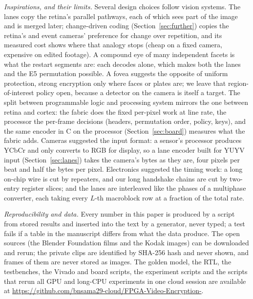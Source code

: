 \textit{Inspirations, and their limits.} Several design choices follow vision systems. The lanes copy the retina's parallel pathways, each of which sees part of the image and is merged later; change-driven coding (Section~\ref{sec:further}) copies the retina's and event cameras' preference for change over repetition, and its measured cost shows where that analogy stops (cheap on a fixed camera, expensive on edited footage). A compound eye of many independent facets is what the restart segments are: each decodes alone, which makes both the lanes and the E5 permutation possible. A fovea suggests the opposite of uniform protection, strong encryption only where faces or plates are; we leave that region-of-interest policy open, because a detector on the camera is itself a target. The split between programmable logic and processing system mirrors the one between retina and cortex: the fabric does the fixed per-pixel work at line rate, the processor the per-frame decisions (headers, permutation order, policy, keys), and the same encoder in C on the processor (Section~\ref{sec:board}) measures what the fabric adds. Cameras suggested the input format: a sensor's processor produces YCbCr and only converts to RGB for display, so a lane encoder built for YUYV input (Section~\ref{sec:lanes}) takes the camera's bytes as they are, four pixels per beat and half the bytes per pixel. Electronics suggested the timing work: a long on-chip wire is cut by repeaters, and our long handshake chains are cut by two-entry register slices; and the lanes are interleaved like the phases of a multiphase converter, each taking every $L$-th macroblock row at a fraction of the total rate.

\textit{Reproducibility and data.} Every number in this paper is produced by a script from stored results and inserted into the text by a generator, never typed; a test fails if a table in the manuscript differs from what the data produce. The open sources (the Blender Foundation films and the Kodak images) can be downloaded and rerun; the private clips are identified by SHA-256 hash and never shown, and frames of them are never stored as images. The golden model, the RTL, the testbenches, the Vivado and board scripts, the experiment scripts and the scripts that rerun all GPU and long-CPU experiments in one cloud session are available at \url{https://github.com/bnsama29-cloud/FPGA-Video-Encryption-}.

